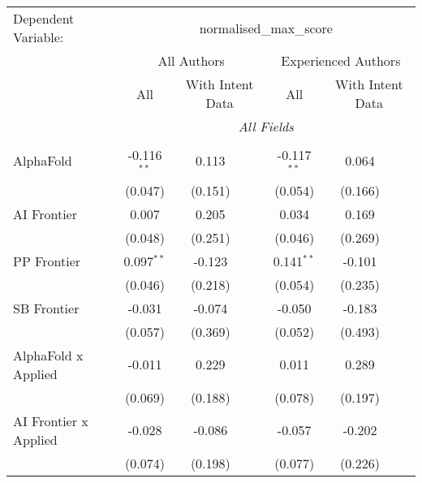 \begingroup
\centering
\begin{tabular}{lcccccc}
   \tabularnewline \midrule \midrule
   Dependent Variable: & \multicolumn{6}{c}{normalised\_max\_score}\\
 & \multicolumn{3}{c}{All Authors} & \multicolumn{3}{c}{Experienced Authors} \\
\cmidrule(lr){2-4} \cmidrule(lr){5-7}
 & \multicolumn{1}{c}{All} & \multicolumn{2}{c}{With Intent Data} & \multicolumn{1}{c}{All} & \multicolumn{2}{c}{With Intent Data} \\
\cmidrule(lr){2-2} \cmidrule(lr){3-4} \cmidrule(lr){5-5} \cmidrule(lr){6-7}
 & \multicolumn{6}{c}{\textit{All Fields}} \\ \\
   AlphaFold                      & -0.116$^{**}$ & 0.113         &               & -0.117$^{**}$ & 0.064   &   \\   
                                  & (0.047)       & (0.151)       &               & (0.054)       & (0.166) &   \\   
   AI Frontier                    & 0.007         & 0.205         &               & 0.034         & 0.169   &   \\   
                                  & (0.048)       & (0.251)       &               & (0.046)       & (0.269) &   \\   
   PP Frontier                    & 0.097$^{**}$  & -0.123        &               & 0.141$^{**}$  & -0.101  &   \\   
                                  & (0.046)       & (0.218)       &               & (0.054)       & (0.235) &   \\   
   SB Frontier                    & -0.031        & -0.074        &               & -0.050        & -0.183  &   \\   
                                  & (0.057)       & (0.369)       &               & (0.052)       & (0.493) &   \\   
   AlphaFold x Applied            & -0.011        & 0.229         &               & 0.011         & 0.289   &   \\   
                                  & (0.069)       & (0.188)       &               & (0.078)       & (0.197) &   \\   
   AI Frontier x Applied          & -0.028        & -0.086        &               & -0.057        & -0.202  &   \\   
                                  & (0.074)       & (0.198)       &               & (0.077)       & (0.226) &   \\   

\end{tabular}
